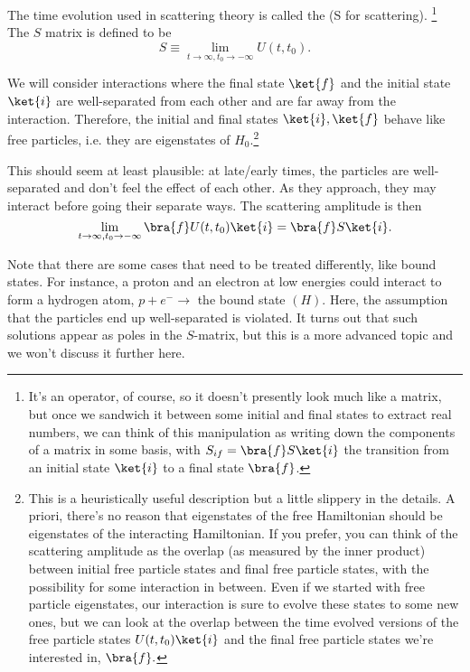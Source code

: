 \begin{defn}
The time evolution used in scattering theory is called the  (S for scattering).%
    \footnote{It's an operator, of course, so it doesn't presently look much like a matrix, but once we sandwich it between some initial and final states to extract real numbers, we can think of this manipulation as writing down the components of a matrix in some basis, with $S_{if} = \bra{f}S\ket{i}$ the transition from an initial state $\ket{i}$ to a final state $\bra{f}$.}
The $S$ matrix is defined to be
\begin{equation}
    S\equiv\lim_{t\to \infty,t_0\to -\infty}U(t,t_0).
\end{equation}
\end{defn}
We will consider interactions where the final state $\ket{f}$ and the initial state $\ket{i}$ are well-separated from each other and are far away from the interaction. Therefore, the initial and final states $\ket{i},\ket{f}$ behave like free particles, i.e. they are eigenstates of $H_0$.\footnote{This is a heuristically useful description but a little slippery in the details. A  priori, there's no reason that eigenstates of the free Hamiltonian should be eigenstates of the interacting Hamiltonian. If you prefer, you can think of the scattering amplitude as the overlap (as measured by the inner product) between initial free particle states and final free particle states, with the possibility for some interaction in between. Even if we started with free particle eigenstates, our interaction is sure to evolve these states to some new ones, but we can look at the overlap between the time evolved versions of the free particle states $U(t,t_0)\ket{i}$ and the final free particle states we're interested in, $\bra{f}.$}

This should seem at least plausible: at late/early times, the particles are well-separated and don't feel the effect of each other. As they approach, they may interact before going their separate ways. The scattering amplitude is then
$$\lim_{t\to\infty, t_0\to -\infty}\bra{f}U(t,t_0)\ket{i}=\bra{f}S \ket{i}.$$

Note that there are some cases that need to be treated differently, like bound states. For instance, a proton and an electron at low energies could interact to form a hydrogen atom, $p+e^-\to$ the bound state $(H)$. Here, the assumption that the particles end up well-separated is violated. It turns out that such solutions appear as poles in the $S$-matrix, but this is a more advanced topic and we won't discuss it further here.

